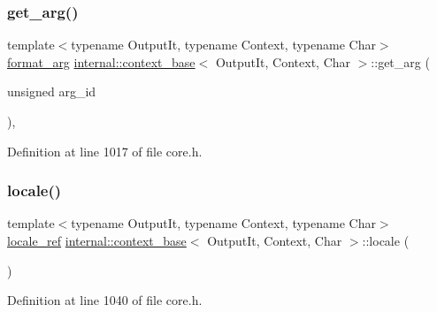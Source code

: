 \subsubsection{\texorpdfstring{get\+\_\+arg()}{get\_arg()}}
{\footnotesize\ttfamily template$<$typename Output\+It, typename Context, typename Char$>$ \\
\hyperlink{classinternal_1_1context__base_aa0c806d3176db7f4c5e5a0fa08561102}{format\+\_\+arg} \hyperlink{classinternal_1_1context__base}{internal\+::context\+\_\+base}$<$ Output\+It, Context, Char $>$\+::get\+\_\+arg (\begin{DoxyParamCaption}\item[{unsigned}]{arg\+\_\+id }\end{DoxyParamCaption})\hspace{0.3cm}{\ttfamily [inline]}, {\ttfamily [protected]}}



Definition at line 1017 of file core.\+h.

\mbox{\label{classinternal_1_1context__base_aa60dff208558ea95aadc2cc20af382ce}} 
\subsubsection{\texorpdfstring{locale()}{locale()}}
{\footnotesize\ttfamily template$<$typename Output\+It, typename Context, typename Char$>$ \\
\hyperlink{classinternal_1_1locale__ref}{locale\+\_\+ref} \hyperlink{classinternal_1_1context__base}{internal\+::context\+\_\+base}$<$ Output\+It, Context, Char $>$\+::locale (\begin{DoxyParamCaption}{ }\end{DoxyParamCaption})\hspace{0.3cm}{\ttfamily [inline]}}



Definition at line 1040 of file core.\+h.

\mbox{\label{classinternal_1_1context__base_a79b1e03aabedc2e157b34cc7adadf451}} 
